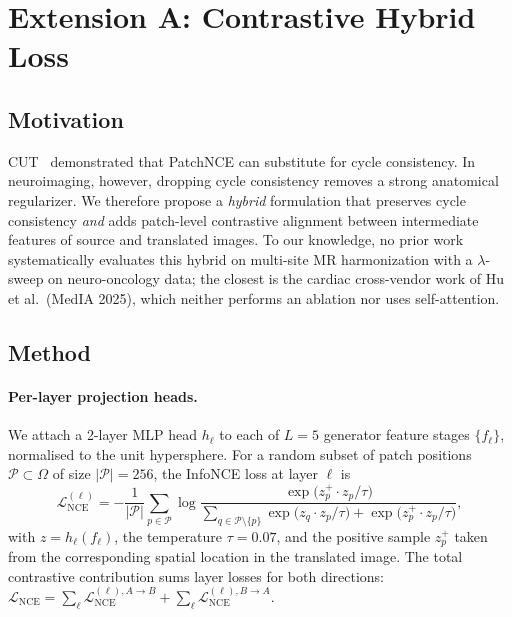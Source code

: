 \documentclass[11pt]{article}
\begin{document}
\section{Extension A: Contrastive Hybrid Loss}
\label{sec:extA}

\subsection{Motivation}
CUT~\citep{park2020contrastive} demonstrated that PatchNCE can substitute
for cycle consistency. In neuroimaging, however, dropping cycle consistency
removes a strong anatomical regularizer. We therefore propose a \emph{hybrid}
formulation that preserves cycle consistency \emph{and} adds patch-level
contrastive alignment between intermediate features of source and translated
images. To our knowledge, no prior work systematically evaluates this hybrid on
multi-site MR harmonization with a $\lambda$-sweep on neuro-oncology data;
the closest is the cardiac cross-vendor work of Hu et al.~(MedIA 2025), which
neither performs an ablation nor uses self-attention.

\subsection{Method}
\paragraph{Per-layer projection heads.}
We attach a 2-layer MLP head $h_\ell$ to each of $L{=}5$ generator
feature stages $\{f_\ell\}$, normalised to the unit hypersphere. For a
random subset of patch positions $\mathcal{P}\subset\Omega$ of size
$|\mathcal{P}|{=}256$, the InfoNCE loss at layer $\ell$ is
\begin{equation}
  \mathcal{L}^{(\ell)}_{\mathrm{NCE}} = -\frac{1}{|\mathcal{P}|}\sum_{p\in\mathcal{P}}
       \log \frac{\exp\!\bigl(z_p^+\cdot z_p / \tau\bigr)}
                 {\sum_{q\in\mathcal{P}\setminus\{p\}}\exp\!\bigl(z_q\cdot z_p / \tau\bigr)
                  + \exp\!\bigl(z_p^+\cdot z_p / \tau\bigr)},
  \label{eq:nce}
\end{equation}
with $z=h_\ell(f_\ell)$, the temperature $\tau{=}0.07$, and the positive sample
$z_p^+$ taken from the corresponding spatial location in the translated image.
The total contrastive contribution sums layer losses for both directions:
$\mathcal{L}_{\mathrm{NCE}}=\sum_\ell \mathcal{L}^{(\ell),A\to B}_{\mathrm{NCE}}
+\sum_\ell \mathcal{L}^{(\ell),B\to A}_{\mathrm{NCE}}$.
\end{document}
